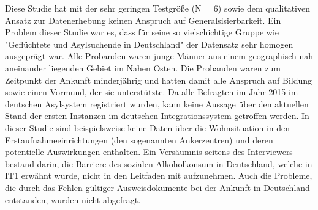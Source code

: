 Diese Studie hat mit der sehr geringen Testgröße (N = 6) sowie dem qualitativen Ansatz zur Datenerhebung keinen Anspruch auf Generalsisierbarkeit.\newline
Ein Problem dieser Studie war es, dass für seine so vielschichtige Gruppe wie "Geflüchtete und Asylsuchende in Deutschland" der Datensatz sehr homogen ausgeprägt war.\newline 
Alle Probanden waren junge Männer aus einem geographisch nah aneinander liegenden Gebiet im Nahen Osten.\newline
Die Probanden waren zum Zeitpunkt der Ankunft minderjährig und hatten damit alle Anspruch auf Bildung sowie einen Vormund, der sie unterstützte.\newline
Da alle Befragten im Jahr 2015 im deutschen Asylsystem registriert wurden, kann keine Aussage über den aktuellen Stand der ersten Instanzen im deutschen Integrationssystem getroffen werden.
In dieser Studie sind beispielsweise keine Daten über die Wohnsituation in den Erstaufnahmeeinrichtungen (den sogenannten Ankerzentren) und deren potentielle Auswirkungen enthalten.\newline
Ein Versäumnis seitens des Interviewers bestand darin, die Barriere des sozialen Alkoholkonsum in Deutschland, welche in IT1 erwähnt wurde, nicht in den Leitfaden mit aufzunehmen.
Auch die Probleme, die durch das Fehlen gültiger Ausweisdokumente bei der Ankunft in Deutschland entstanden, wurden nicht abgefragt.